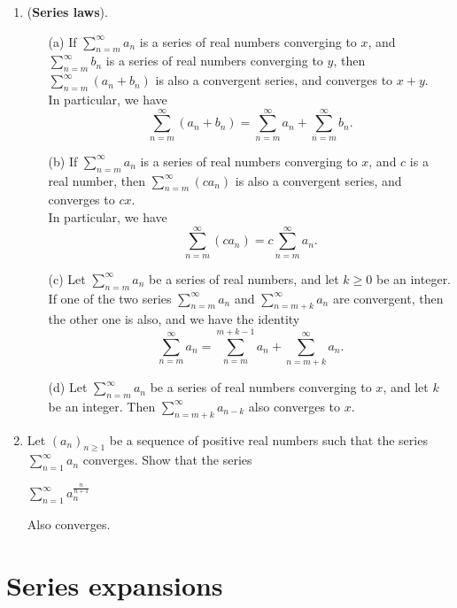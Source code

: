 \documentclass{article}
\theoremstyle{remark}
\begin{document}
\begin{enumerate}
    \item (\textbf{Series laws}).
    \begin{enumerate}
        \item[(a)] If \( \sum_{n=m}^{\infty} a_n \) is a series of real numbers converging to \( x \), and
        \( \sum_{n=m}^{\infty} b_n \) is a series of real numbers converging to \( y \), then
        \( \sum_{n=m}^{\infty} (a_n + b_n) \) is also a convergent series, and converges to \( x + y \).\\
        In particular, we have
        \[
        \sum_{n=m}^{\infty} (a_n + b_n)
        = \sum_{n=m}^{\infty} a_n + \sum_{n=m}^{\infty} b_n.
        \]

        \item[(b)] If \( \sum_{n=m}^{\infty} a_n \) is a series of real numbers converging to \( x \), and
        \( c \) is a real number, then \( \sum_{n=m}^{\infty} (c a_n) \) is also a convergent series, and
        converges to \( cx \).\\
        In particular, we have
        \[
        \sum_{n=m}^{\infty} (c a_n)
        = c \sum_{n=m}^{\infty} a_n.
        \]

        \item[(c)] Let \( \sum_{n=m}^{\infty} a_n \) be a series of real numbers, and let
        \( k \geq 0 \) be an integer. If one of the two series
        \( \sum_{n=m}^{\infty} a_n \) and \( \sum_{n=m+k}^{\infty} a_n \) are convergent,
        then the other one is also, and we have the identity
        \[
            \sum_{n=m}^{\infty} a_n
            = \sum_{n=m}^{m+k-1} a_n + \sum_{n=m+k}^{\infty} a_n.
        \]

        \item[(d)] Let \( \sum_{n=m}^{\infty} a_n \) be a series of real numbers converging to \( x \),
        and let \( k \) be an integer. Then
        \( \sum_{n=m+k}^{\infty} a_{n-k} \) also converges to \( x \).
    \end{enumerate}

    \item Let $(a_n)_{n\geq 1}$ be a sequence of positive real numbers such that
    the series $\sum_{n=1}^{\infty}a_n$ converges. Show that the series
    \begin{center}
        $\displaystyle \sum_{n=1}^{\infty}a_n^{\frac{n}{n+1}}$
    \end{center}
    Also converges.
\end{enumerate}
\section*{Series expansions}
\end{document}
